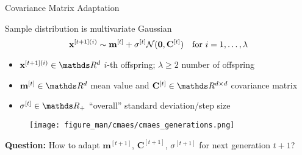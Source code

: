 \documentclass[11pt,compress,t,notes=noshow, xcolor=table]{beamer}
\begin{document}






\begin{vbframe}{Covariance Matrix Adaptation}

Sample distribution is multivariate Gaussian
$$
    \mathbf{x}^{[t+1](i)} \sim \mathbf{m}^{[t]} + \sigma^{[t]} \mathcal{N} (\bm{0}, \mathbf{C}^{[t]}) \quad \text{for } i = 1, \dots, \lambda
$$
\vspace{-20pt}
\begin{itemize}
\item $\xv^{[t+1](i)} \in \R^d$ $i$-th offspring; $\lambda \geq 2$ number of offspring
\item $\mathbf{m}^{[t]} \in \R^d$ mean value and $\mathbf{C}^{[t]} \in \R^{d \times d}$ covariance matrix
\item $\sigma^{[t]} \in \R_{+}$ \enquote{overall} standard deviation/step size
\end{itemize}

\begin{figure}
  \texttt{[image: figure\_man/cmaes/cmaes\_generations.png]}
\end{figure}


\textbf{Question:} How to adapt $\mathbf{m}^{[t+1]}$, $\mathbf{C}^{[t+1]}$, $\sigma^{[t+1]}$ for next generation $t+1$?

\end{vbframe}
\end{document}
